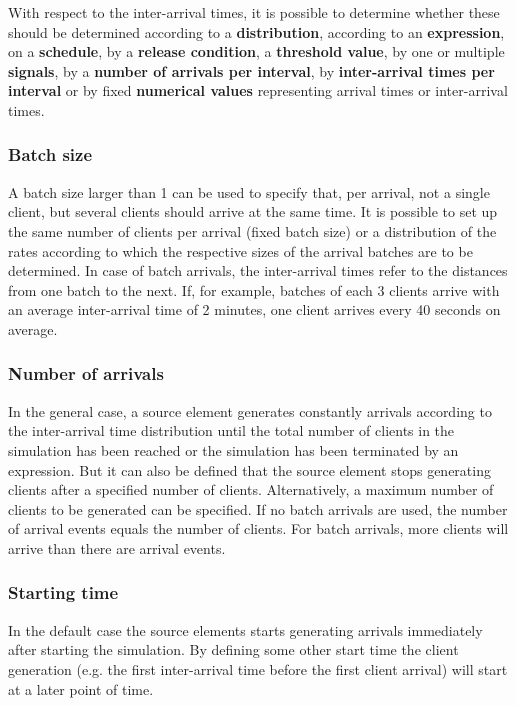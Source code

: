 With respect to the inter-arrival times, it is possible to determine whether these
should be determined according to a \textbf{distribution}, according to an \textbf{expression},
on a \textbf{schedule}, by a \textbf{release condition}, a \textbf{threshold value}, by
one or multiple \textbf{signals}, by a \textbf{number of arrivals per interval}, by
\textbf{inter-arrival times per interval} or by fixed \textbf{numerical values}
representing arrival times or inter-arrival times.

\subsubsection*{Batch size}

A batch size larger than 1 can be used to specify that, per arrival, not a single client,
but several clients should arrive at the same time. It is possible to set up the same number
of clients per arrival (fixed batch size) or a distribution of the rates according to which
the respective sizes of the arrival batches are to be determined.
In case of batch arrivals, the inter-arrival times refer to the distances from one batch to the next.
If, for example, batches of each 3 clients arrive with an average inter-arrival time of 2 minutes,
one client arrives every 40 seconds on average.

\subsubsection*{Number of arrivals}

In the general case, a source element generates constantly arrivals according to the
inter-arrival time distribution until the total number of clients in the simulation has been reached
or the simulation has been terminated by an expression. But it can also be defined that the
source element stops generating clients after a specified number of clients.
Alternatively, a maximum number of clients to be generated can be specified.
If no batch arrivals are used, the number of arrival events equals the
number of clients. For batch arrivals, more clients will arrive than there are arrival events.

\subsubsection*{Starting time}

In the default case the source elements starts generating arrivals immediately after
starting the simulation. By defining some other start time the client generation
(e.g. the first inter-arrival time before the first client arrival) will start at a later
point of time.

